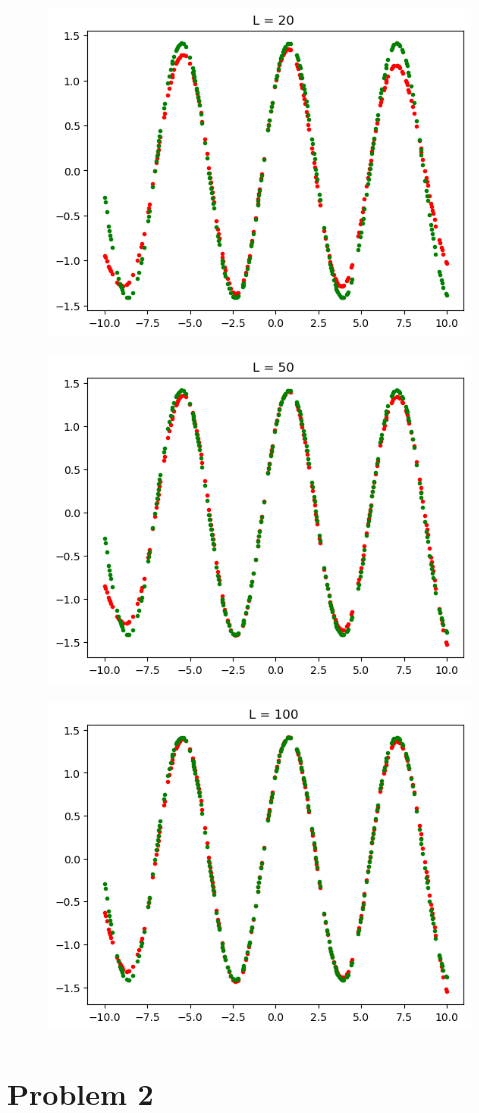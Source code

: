 \documentclass[a4paper,11pt]{article}
\begin{document}
\begin{mlsolution}
\begin{figure}[h!]
	\centering
	\includegraphics[width=0.5\linewidth]{2.3.png}
	\label{fig:2.3}
\end{figure}
\begin{figure}[h!]
	\centering
	\includegraphics[width=0.5\linewidth]{2.4.png}
	\label{fig:2.4}
\end{figure}

\begin{figure}[H]
	\centering
	\includegraphics[width=0.5\linewidth]{2.5.png}
	\label{fig:2.5}
\end{figure}
\newpage
\section{Problem 2}


\end{mlsolution}
\end{document}
